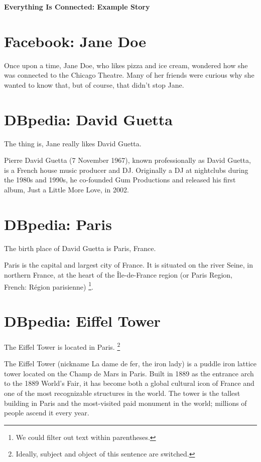 \documentclass{article}
\begin{document}
{\Large\bf Everything Is Connected: Example Story}

\section{Facebook: Jane Doe}
Once upon a time,
Jane Doe,
who likes pizza and ice cream,
wondered how she was connected to the Chicago Theatre.
Many of her friends were curious
why she wanted to know that,
but of course, that didn't stop
Jane.

\section{DBpedia: David Guetta}
The thing is,
Jane really likes David Guetta.

Pierre David Guetta (7 November 1967), known professionally as David Guetta, is a French house music producer and DJ. Originally a DJ at nightclubs during the 1980s and 1990s, he co-founded Gum Productions and released his first album, Just a Little More Love, in 2002.

\section{DBpedia: Paris}
The birth place of David Guetta is Paris, France.

Paris is the capital and largest city of France. It is situated on the river Seine, in northern France, at the heart of the Île-de-France region (or Paris Region, French: Région parisienne)%
\footnote{We could filter out text within parentheses.}.

\section{DBpedia: Eiffel Tower}
The Eiffel Tower is located in Paris.%
\footnote{Ideally, subject and object of this sentence are switched.}

The Eiffel Tower (nickname La dame de fer, the iron lady) is a puddle iron lattice tower located on the Champ de Mars in Paris. Built in 1889 as the entrance arch to the 1889 World's Fair, it has become both a global cultural icon of France and one of the most recognizable structures in the world. The tower is the tallest building in Paris and the most-visited paid monument in the world; millions of people ascend it every year.
\end{document}
